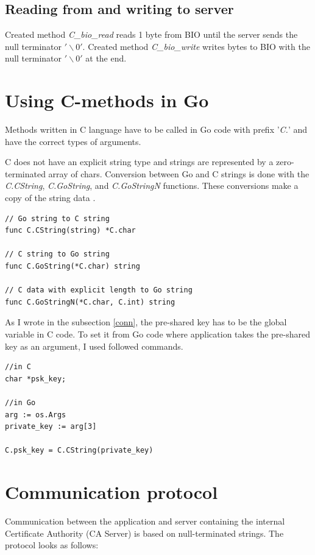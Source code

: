 \documentclass[
  digital, %
  notable,   %
  lof,     %
  lot,     %
]{fithesis3}
\begin{document}
\subsection{Reading from and writing to server}
Created method \textit{C\_bio\_read} reads 1 byte from BIO until the server sends the null 
terminator $'\backslash0'$. Created method \textit{C\_bio\_write} writes bytes to BIO with the 
null terminator $'\backslash0'$ at the end.

\section{Using C-methods in Go}\label{c-method}
Methods written in C language have to be called in Go code with prefix '\textit{C.}' and have the 
correct types of arguments. 

C does not have an explicit string type and strings are represented by 
a zero-terminated array of chars. Conversion between Go and C strings is done with the 
\textit{C.CString}, \textit{C.GoString}, and \textit{C.GoStringN} functions. These conversions 
make a copy of the string data \cite{bloggolangorg}. 

\begin{lstlisting}
// Go string to C string
func C.CString(string) *C.char

// C string to Go string
func C.GoString(*C.char) string

// C data with explicit length to Go string
func C.GoStringN(*C.char, C.int) string
\end{lstlisting}

As I wrote in the subsection \ref{conn}, the pre-shared key has to be the global variable in C 
code. To set it from Go code where application takes the pre-shared key as an argument, I used 
followed commands.
\begin{lstlisting}
//in C
char *psk_key;

//in Go
arg := os.Args
private_key := arg[3]

C.psk_key = C.CString(private_key)
\end{lstlisting}

\section{Communication protocol}
Communication between the application and server containing the internal Certificate Authority (CA Server) is based on null-terminated strings. The protocol looks as follows:
\end{document}
